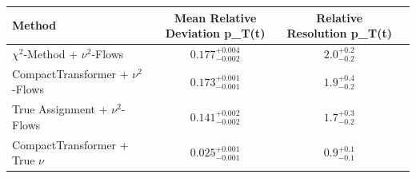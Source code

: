     \begin{tabular}{lccc}
        \toprule
        Method & Mean Relative Deviation p_{T}(t) & Relative Resolution p_{T}(t) \\
        \midrule
        $\chi^2$-Method + $\nu^2$-Flows & $0.177_{-0.002}^{+0.004}$ & $2.0_{-0.2}^{+0.2}$ \\
        CompactTransformer + $\nu^2$-Flows & $0.173_{-0.001}^{+0.001}$ & $1.9_{-0.2}^{+0.4}$ \\
        True Assignment + $\nu^2$-Flows & $0.141_{-0.002}^{+0.002}$ & $1.7_{-0.2}^{+0.3}$ \\
        CompactTransformer + True $\nu$ & $0.025_{-0.001}^{+0.001}$ & $0.9_{-0.1}^{+0.1}$ \\
        \bottomrule
    \end{tabular}